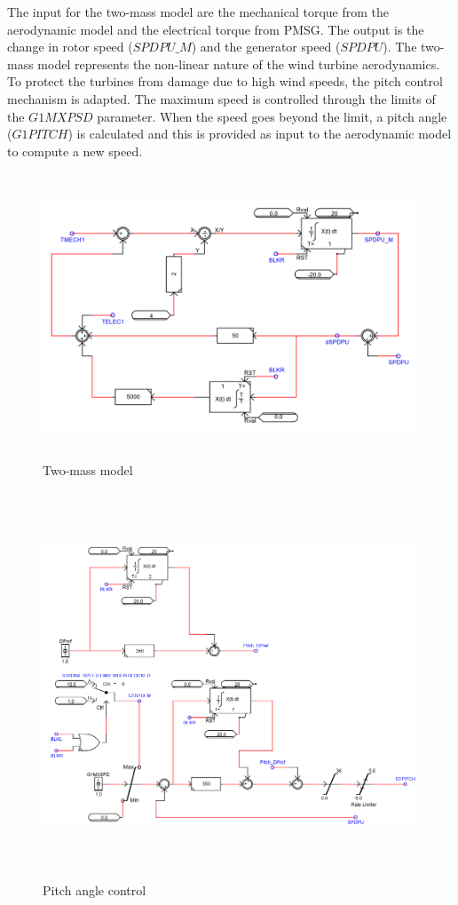 The input for the two-mass model are the mechanical torque from the aerodynamic model and the electrical torque from \gls{PMSG}. The output is the change in rotor speed ($SPDPU\_M$) and the generator speed ($SPDPU$). The two-mass model represents the non-linear nature of the wind turbine aerodynamics. To protect the turbines from damage due to high wind speeds, the pitch control mechanism is adapted. The maximum speed is controlled through the limits of the $G1MXPSD$ parameter. When the speed goes beyond the limit, a pitch angle ($G1PITCH$) is calculated and this is provided as input to the aerodynamic model to compute a new speed.  

\begin{figure}[H]
\centering
    \includegraphics[height = 8.5cm,width = 12.5cm]{Diagrams/Appendix_A/Two_mass_model.PNG}
    \caption{Two-mass model}
    \label{fig:Two-mass model}
\end{figure}

\begin{figure}[H]
\centering
    \includegraphics[height = 11.5cm,width = 14.5cm]{Diagrams/Appendix_A/Pitch_controller.PNG}
    \caption{Pitch angle control}
    \label{fig:Pitch_controller}
\end{figure}

